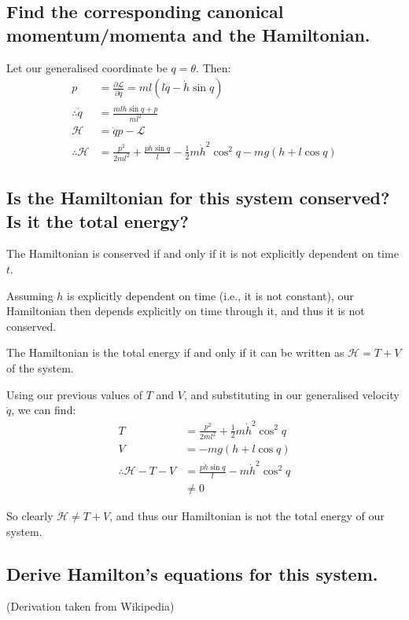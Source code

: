 \documentclass[a4paper]{scrartcl}
\begin{document}
\subsection{Find the corresponding canonical momentum/momenta and the Hamiltonian.}
Let our generalised coordinate be \(q = \theta\). Then:
\begin{align*}
    p &= \frac{\partial \mathcal{L}}{\partial \dot{q}} = m l \left(l \dot{q} - \dot{h} \sin q\right) \\
    \therefore \dot{q} &= \frac{m l \dot{h} \sin q + p}{m l^2} \\
    \mathcal{H} &= \dot{q} p - \mathcal{L} \\
    \therefore \mathcal{H} &= \frac{p^2}{2 m l^2} + \frac{p \dot{h} \sin q}{l} - \frac{1}{2} m \dot{h}^2 \cos^2 q - m g (h + l \cos q)
\end{align*}

\subsection{Is the Hamiltonian for this system conserved? Is it the total energy?}
The Hamiltonian is conserved if and only if it is not explicitly dependent on time \(t\).

Assuming \(h\) is explicitly dependent on time (i.e., it is not constant), our Hamiltonian then depends explicitly on time through it, and thus it is not conserved.

The Hamiltonian is the total energy if and only if it can be written as \(\mathcal{H} = T + V\) of the system.

Using our previous values of \(T\) and \(V\), and substituting in our generalised velocity \(\dot{q}\), we can find:
\begin{align*}
    T &= \frac{p^2}{2 m l^2} + \frac{1}{2} m \dot{h}^2 \cos^2 q \\
    V &= -m g (h + l \cos q) \\
    \therefore \mathcal{H} - T - V &= \frac{p \dot{h} \sin q}{l} - m \dot{h}^2 \cos^2 q \\
    &\neq 0
\end{align*}

So clearly \(\mathcal{H} \neq T + V\), and thus our Hamiltonian is not the total energy of our system.

\subsection{Derive Hamilton's equations for this system.}
(Derivation taken from Wikipedia)
\end{document}
